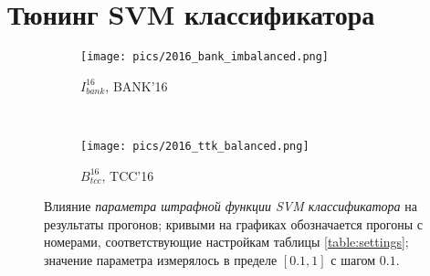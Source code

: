 \section{Тюнинг SVM классификатора}

\begin{figure}[!htp] \centering
    \begin{subfigure}[b]{0.48\textwidth}
        \texttt{[image: pics/2016\_bank\_imbalanced.png]}
        \caption{$I_{bank}^{16}$, BANK'16}
        \label{fig:bank_cost_changes_2016}
    \end{subfigure}
    ~
    \begin{subfigure}[b]{0.48\textwidth}
        \texttt{[image: pics/2016\_ttk\_balanced.png]}
        \caption{$B_{tcc}^{16}$, TCC'16}
        \label{fig:tcc_cost_changes_2016}
    \end{subfigure}

    \caption{
        Влияние {\it параметра штрафной функции SVM классификатора}
        на результаты прогонов;
        кривыми на графиках обозначается прогоны с номерами, соответствующие
        настройкам таблицы \ref{table:settings};
        значение параметра измерялось в пределе $[0.1, 1]$ с шагом $0.1$.
    }
    \label{fig:cost}
\end{figure}
